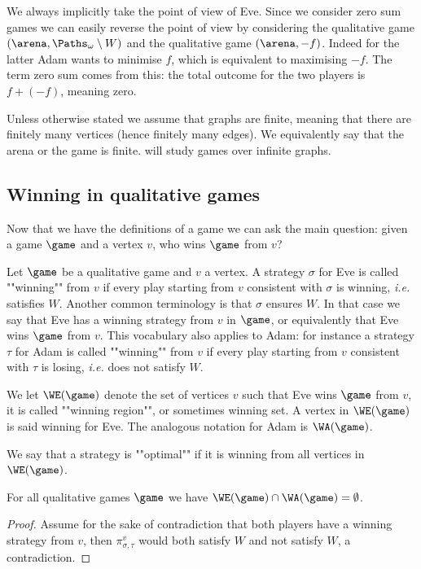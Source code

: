 We always implicitly take the point of view of Eve. 
Since we consider zero sum games we can easily reverse the point of view by considering the qualitative game 
$(\arena,\Paths_\omega \setminus W)$ and the qualitative game $(\arena,-f)$.
Indeed for the latter Adam wants to minimise $f$, which is equivalent to maximising $-f$.
The term zero sum comes from this: the total outcome for the two players is $f + (-f)$, meaning zero.

\begin{remark}
Unless otherwise stated we assume that graphs are finite, meaning that there are finitely many vertices (hence finitely many edges).
We equivalently say that the arena or the game is finite.
 will study games over infinite graphs.
\end{remark}

\subsection*{Winning in qualitative games}
Now that we have the definitions of a game we can ask the main question: 
given a game $\game$ and a vertex $v$, who wins $\game$ from $v$?

Let $\game$ be a qualitative game and $v$ a vertex.
A strategy $\sigma$ for Eve is called ""winning"" from $v$ if every play starting from $v$ consistent with $\sigma$ is winning, 
\textit{i.e.} satisfies $W$.
Another common terminology is that $\sigma$ ensures $W$.
In that case we say that Eve has a winning strategy from $v$ in $\game$, or equivalently that Eve wins $\game$ from $v$.
This vocabulary also applies to Adam: for instance 
a strategy $\tau$ for Adam is called ""winning"" from $v$ if every play starting from $v$ consistent with $\tau$ is losing, 
\textit{i.e.} does not satisfy $W$.

We let $\WE(\game)$ denote the set of vertices $v$ such that Eve wins $\game$ from $v$,
it is called ""winning region"", or sometimes winning set. 
A vertex in $\WE(\game)$ is said winning for Eve.
The analogous notation for Adam is $\WA(\game)$.

We say that a strategy is ""optimal"" if it is winning from all vertices in $\WE(\game)$.

\begin{fact}
For all qualitative games $\game$ we have $\WE(\game) \cap \WA(\game) = \emptyset$.
\end{fact}
\begin{proof}
Assume for the sake of contradiction that both players have a winning strategy from $v$, then $\pi^{v}_{\sigma,\tau}$
would both satisfy $W$ and not satisfy $W$, a contradiction.
\end{proof}

